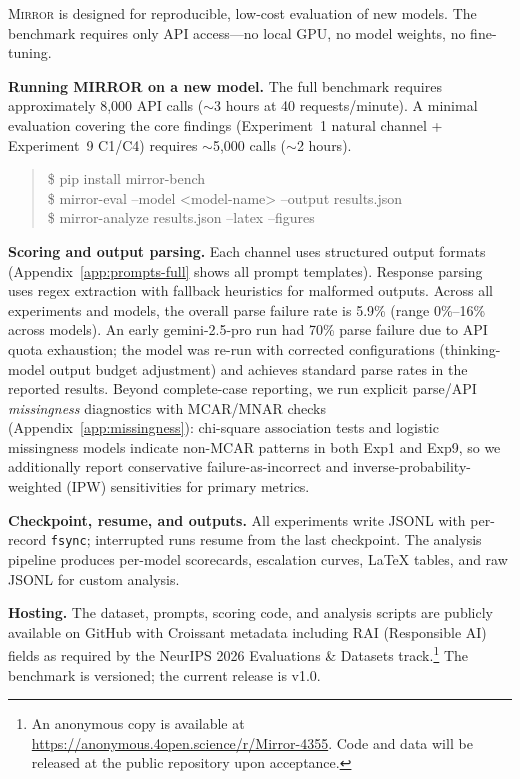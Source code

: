 \documentclass[10pt]{article}
\newcommand{\mirror}{\textsc{Mirror}}
\begin{document}
\mirror{} is designed for reproducible, low-cost evaluation of new models. The
benchmark requires only API access---no local GPU, no model weights, no fine-tuning.

\textbf{Running MIRROR on a new model.} The full benchmark requires approximately
8,000 API calls ($\sim$3 hours at 40 requests/minute). A minimal evaluation
covering the core findings (Experiment~1 natural channel + Experiment~9 C1/C4)
requires $\sim$5,000 calls ($\sim$2 hours).

\begin{quote}\small\ttfamily
\$ pip install mirror-bench \\
\$ mirror-eval --model <model-name> --output results.json \\
\$ mirror-analyze results.json --latex --figures
\end{quote}

\textbf{Scoring and output parsing.} Each channel uses structured output formats
(Appendix~\ref{app:prompts-full} shows all prompt templates). Response parsing uses
regex extraction with fallback heuristics for malformed outputs. Across all experiments and models, the overall parse failure rate is 5.9\%
(range 0\%--16\% across models). An early gemini-2.5-pro run had 70\% parse failure due to API quota exhaustion; the model was re-run with corrected configurations (thinking-model output budget adjustment) and achieves standard parse rates in the reported results. Beyond complete-case reporting, we run explicit parse/API \textit{missingness} diagnostics with MCAR/MNAR checks (Appendix~\ref{app:missingness}): chi-square association tests and logistic missingness models indicate non-MCAR patterns in both Exp1 and Exp9, so we additionally report conservative failure-as-incorrect and inverse-probability-weighted (IPW) sensitivities for primary metrics.

\textbf{Checkpoint, resume, and outputs.} All experiments write JSONL with
per-record \texttt{fsync}; interrupted runs resume from the last checkpoint.
The analysis pipeline produces per-model scorecards, escalation curves,
LaTeX tables, and raw JSONL for custom analysis.

\textbf{Hosting.} The dataset, prompts, scoring code, and analysis scripts are
publicly available on GitHub with Croissant metadata including RAI
(Responsible AI) fields as required by the NeurIPS 2026 Evaluations \& Datasets
track.\footnote{An anonymous copy is available at \url{https://anonymous.4open.science/r/Mirror-4355}. Code and data will be released at the public repository upon acceptance.} The benchmark is versioned;
the current release is v1.0.
\end{document}
